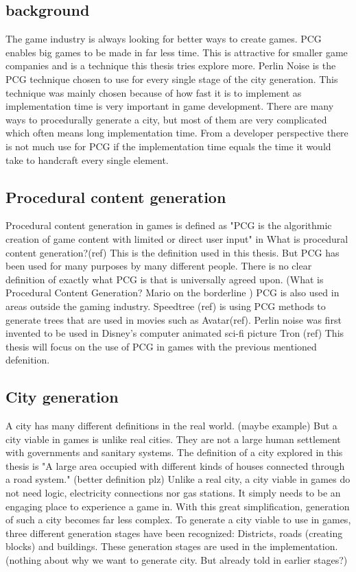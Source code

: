 	\subsection{background}
	The game industry is always looking for better ways to create games. PCG enables big games to be made in far less time. This is attractive for smaller game companies and is a technique this thesis tries explore more.
	Perlin Noise is the PCG technique chosen to use for every single stage of the city generation. This technique was mainly chosen because of how fast it is to implement as implementation time is very important in game development.
	There are many ways to procedurally generate a city, but most of them are very complicated which often means long implementation time. From a developer perspective there is not much use for PCG if the implementation time equals the time it would take to handcraft every single element. 
	
	\subsection{Procedural content generation}
	Procedural content generation in games is defined as "PCG is the algorithmic creation of game content with limited or direct user input" in What is procedural content generation?(ref) This is the definition used in this thesis. But PCG has been used for many purposes by many different people. There is no clear definition of exactly what PCG is that is universally agreed upon. (What is Procedural Content Generation?	Mario on the borderline
)
	PCG is also used in areas outside the gaming industry. Speedtree (ref) is using PCG methods to generate trees that are used in movies such as Avatar(ref). Perlin noise was first invented to be used in Disney's computer animated sci-fi picture Tron (ref)
	This thesis will focus on the use of PCG in games with the previous mentioned defenition.
	
	\subsection{City generation}
	A city has many different definitions in the real world. (maybe example) But a city viable in games is unlike real cities. They are not a large human settlement with governments and sanitary systems. The definition of a city explored in this thesis is "A large area occupied with different kinds of houses connected through a road system." (better definition plz)
	Unlike a real city, a city viable in games do not need logic, electricity connections nor gas stations. It simply needs to be an engaging place to experience a game in. With this great simplification, generation of such a city becomes far less complex.
	To generate a city viable to use in games, three different generation stages have been recognized: Districts, roads (creating blocks) and buildings. These generation stages are used in the implementation. (nothing about why we want to generate city. But already told in earlier stages?)
	
